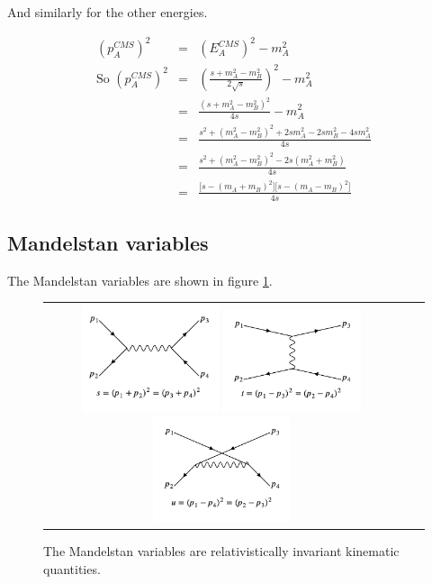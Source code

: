 And similarly for the other energies.

\begin{eqnarray*}
  \left( p^{CMS}_A \right)^2 & = & \left( E^{CMS}_A \right)^2 - m^2_A \\
  \textrm{So } \left(p^{CMS}_A\right)^2 & = & \left( \frac{s + m^2_A - m^2_B}{2\sqrt{s}}\right)^2 - m^2_A \\
  & = & \frac{\left(s + m^2_A - m^2_B\right)^2}{4s}-m^2_A \\
  & = & \frac{s^2 + \left(m^2_A - m^2_B\right)^2 + 2sm^2_A - 2sm^2_B - 4sm^2_A}{4s} \\
  & = & \frac{s^2 + \left(m^2_A - m^2_B\right)^2 - 2s\left(m^2_A + m^2_B\right)}{4s} \\
  & = & \frac{\lbrack s - \left(m_A + m_B\right)^2\rbrack \lbrack s - \left(m_A - m_B\right)^2 \rbrack}{4s}
\end{eqnarray*}

\subsection{Mandelstan variables}

The Mandelstan variables are shown in figure \ref{fig:ch5_mandelstan}.

\begin{figure}[!htb]
  \begin{center}
    \begin{tabular}{ccc}
      \includegraphics[width=0.4\textwidth]{images/web_feynman/image_17.png}
      \includegraphics[width=0.4\textwidth]{images/web_feynman/image_18.png}
      \includegraphics[width=0.4\textwidth]{images/web_feynman/image_19.png}
    \end{tabular}
    \caption[Mandelstan variables]{The Mandelstan variables are relativistically invariant kinematic quantities.}
    \label{fig:ch5_mandelstan}
  \end{center}
\end{figure}

